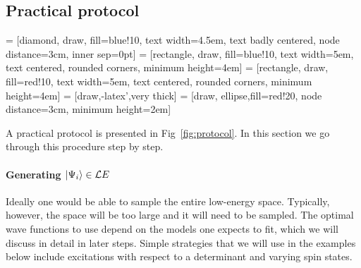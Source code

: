\subsection{Practical protocol}

 = [diamond, draw, fill=blue!10, 
    text width=4.5em, text badly centered, node distance=3cm, inner sep=0pt]
 = [rectangle, draw, fill=blue!10, 
    text width=5em, text centered, rounded corners, minimum height=4em]
 = [rectangle, draw, fill=red!10, 
    text width=5em, text centered, rounded corners, minimum height=4em]
 = [draw,-latex',very thick]
 = [draw, ellipse,fill=red!20, node distance=3cm,
    minimum height=2em]
\begin{figure*}
\caption{A practical protocol for fitting effective models to {\it ab initio} data.}
\label{fig:protocol} 
\end{figure*}

A practical protocol is presented in Fig~\ref{fig:protocol}. 
In this section we go through this procedure step by step.

\paragraph{Generating $\ket{\Psi_i}\in {\mathcal LE}$}
Ideally one would be able to sample the entire low-energy space. 
Typically, however, the space will be too large and it will need to be sampled. 
The optimal wave functions to use depend on the models one expects to fit, which we will discuss in detail  in later steps. 
Simple strategies that we will use in the examples below include excitations with respect to a determinant and varying spin states.


